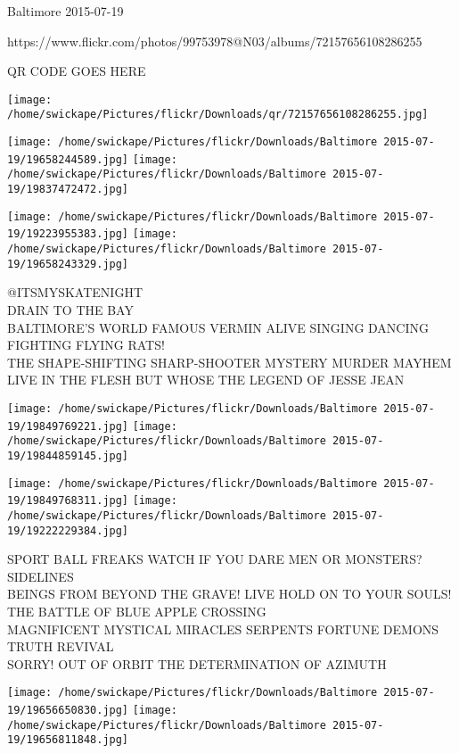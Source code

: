 \documentclass[10pt,letterpaper]{article}
\begin{document}
Baltimore 2015-07-19

https://www.flickr.com/photos/99753978@N03/albums/72157656108286255

QR CODE GOES HERE

\texttt{[image: /home/swickape/Pictures/flickr/Downloads/qr/72157656108286255.jpg]}
\pagebreak

\texttt{[image: /home/swickape/Pictures/flickr/Downloads/Baltimore 2015-07-19/19658244589.jpg]}
\texttt{[image: /home/swickape/Pictures/flickr/Downloads/Baltimore 2015-07-19/19837472472.jpg]}

\texttt{[image: /home/swickape/Pictures/flickr/Downloads/Baltimore 2015-07-19/19223955383.jpg]}
\texttt{[image: /home/swickape/Pictures/flickr/Downloads/Baltimore 2015-07-19/19658243329.jpg]}

@ITSMYSKATENIGHT\\
DRAIN TO THE BAY\\
BALTIMORE'S WORLD FAMOUS VERMIN ALIVE SINGING DANCING FIGHTING FLYING RATS!\\
THE SHAPE{-}SHIFTING SHARP{-}SHOOTER MYSTERY MURDER MAYHEM LIVE IN THE FLESH BUT WHOSE THE LEGEND OF JESSE JEAN\\
\pagebreak

\texttt{[image: /home/swickape/Pictures/flickr/Downloads/Baltimore 2015-07-19/19849769221.jpg]}
\texttt{[image: /home/swickape/Pictures/flickr/Downloads/Baltimore 2015-07-19/19844859145.jpg]}

\texttt{[image: /home/swickape/Pictures/flickr/Downloads/Baltimore 2015-07-19/19849768311.jpg]}
\texttt{[image: /home/swickape/Pictures/flickr/Downloads/Baltimore 2015-07-19/19222229384.jpg]}

SPORT BALL FREAKS WATCH IF YOU DARE MEN OR MONSTERS?  SIDELINES\\
BEINGS FROM BEYOND THE GRAVE!   LIVE HOLD ON TO YOUR SOULS!  THE BATTLE OF BLUE APPLE CROSSING\\
MAGNIFICENT MYSTICAL MIRACLES SERPENTS FORTUNE DEMONS TRUTH REVIVAL\\
SORRY!  OUT OF ORBIT THE DETERMINATION OF AZIMUTH\\
\pagebreak

\texttt{[image: /home/swickape/Pictures/flickr/Downloads/Baltimore 2015-07-19/19656650830.jpg]}
\texttt{[image: /home/swickape/Pictures/flickr/Downloads/Baltimore 2015-07-19/19656811848.jpg]}
\end{document}
